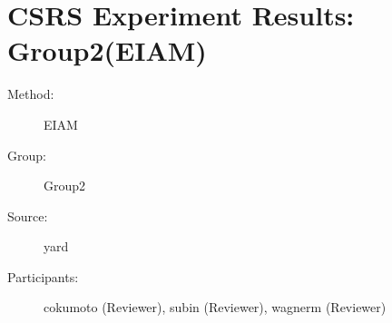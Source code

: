 \chapter {CSRS Experiment Results: Group2(EIAM)}	  
\small

\begin{description}
\item [Method:] EIAM
\item [Group:] Group2
\item [Source:] yard
\item [Participants:] cokumoto (Reviewer), subin (Reviewer), wagnerm (Reviewer)
\end{description}
